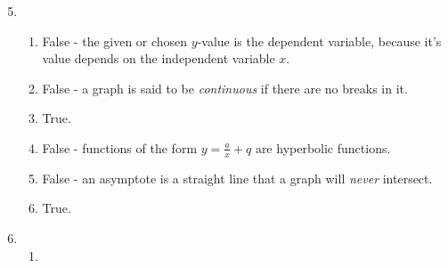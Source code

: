 \begin{eocsolutions}{}
{\begin{enumerate}[itemsep=8pt, label=\textbf{\arabic*}. ] 
\setcounter{enumi}{4}

\item %
  \begin{enumerate}[noitemsep, label=\textbf{(\alph*)} ]
   \item False - the given or chosen $y$-value is the dependent variable, because it's value depends on the independent variable $x$.%
    \item False - a graph is said to be \textit{continuous} if there are no breaks in it.%
    \item True.%
    \item False - functions of the form $y=\frac{a}{x}+q$ are hyperbolic functions.
    \item False - an asymptote is a straight line that a graph will \textit{never} intersect.%
    \item True.%
    \end{enumerate}
\item %
 \begin{enumerate}[noitemsep, label=\textbf{(\alph*)} ]

    \item %
\end{enumerate}
\end{enumerate}}
\end{eocsolutions}
